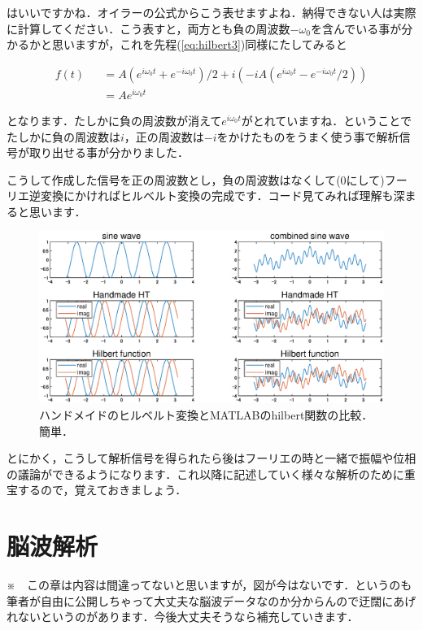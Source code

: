 \documentclass[11pt,a4paper]{ujreport} 	%
\begin{document}
はいいですかね．オイラーの公式からこう表せますよね．納得できない人は実際に計算してください．こう表すと，両方とも負の周波数$-\omega_0$を含んでいる事が分かるかと思いますが，これを先程(\ref{eq:hilbert3})同様にたしてみると

\begin{align}
  f(t) &&= A(e^{i\omega_0 t} + e^{-i\omega_0 t})/2 + i(-iA(e^{i\omega_0 t} - e^{-i\omega_0 t}/2)) \\
  &&= Ae^{i\omega_0 t}
\end{align}

となります．たしかに負の周波数が消えて$e^{i\omega_0 t}$がとれていますね．ということでたしかに負の周波数は$i$，正の周波数は$-i$をかけたものをうまく使う事で解析信号が取り出せる事が分かりました．

こうして作成した信号を正の周波数とし，負の周波数はなくして(0にして)フーリエ逆変換にかければヒルベルト変換の完成です．コード見てみれば理解も深まると思います．

\begin{figure}[H]
  \centering
  \includegraphics[width=15cm]{../figures/hilbert.eps}
  \caption{ハンドメイドのヒルベルト変換とMATLABのhilbert関数の比較．簡単．}
\end{figure}

とにかく，こうして解析信号を得られたら後はフーリエの時と一緒で振幅や位相の議論ができるようになります．これ以降に記述していく様々な解析のために重宝するので，覚えておきましょう．

















\chapter{脳波解析}
※　この章は内容は間違ってないと思いますが，図が今はないです．というのも筆者が自由に公開しちゃって大丈夫な脳波データなのか分からんので迂闊にあげれないというのがあります．今後大丈夫そうなら補充していきます．\\\\\\\\
\end{document}

